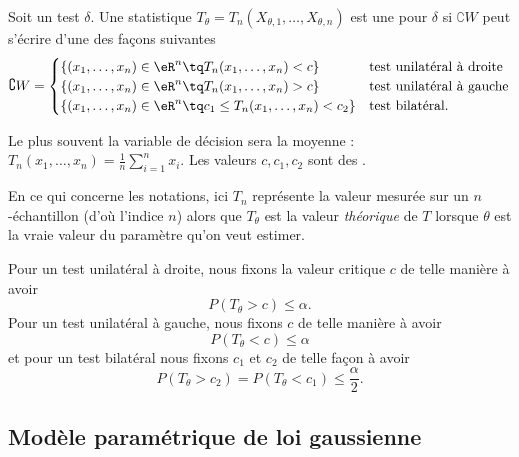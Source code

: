 Soit un test \( \delta\). Une statistique \( T_{\theta}=T_n(X_{\theta,1},\ldots,X_{\theta,n})\) est une  pour \( \delta\) si \( \complement W\) peut s'écrire d'une des façons suivantes
\begin{equation}
	\complement W=\begin{cases}
		\{ (x_1,\ldots,x_n)\in\eR^n\tq T_n(x_1,\ldots,x_n)<c \}           & \text{test unilatéral à droite} \\
		\{ (x_1,\ldots,x_n)\in\eR^n\tq T_n(x_1,\ldots,x_n)>c \}           & \text{test unilatéral à gauche} \\
		\{ (x_1,\ldots,x_n)\in\eR^n\tq c_1\leq T_n(x_1,\ldots,x_n)<c_2 \} & \text{test bilatéral}.
	\end{cases}
\end{equation}

Le plus souvent la variable de décision sera la moyenne : \( T_n(x_1,\ldots,x_n)=\frac{1}{ n }\sum_{i=1}^nx_i\). Les valeurs \( c,c_1,c_2\) sont des .

En ce qui concerne les notations, ici \( T_n\) représente la valeur mesurée sur un \( n\)-échantillon (d'où l'indice \( n\)) alors que \( T_{\theta}\) est la valeur \emph{théorique} de \( T\) lorsque \( \theta\) est la vraie valeur du paramètre qu'on veut estimer.

Pour un test unilatéral à droite, nous fixons la valeur critique \( c\) de telle manière à avoir
\begin{equation}
	P(T_{\theta}>c)\leq \alpha.
\end{equation}
Pour un test unilatéral à gauche, nous fixons \( c\) de telle manière à avoir
\begin{equation}
	P(T_{\theta}<c)\leq \alpha
\end{equation}
et pour un test bilatéral nous fixons \( c_1\) et \( c_2\) de telle façon à avoir
\begin{equation}
	P(T_{\theta}>c_2)=P(T_{\theta}<c_1)\leq\frac{ \alpha }{2}.
\end{equation}

\subsection{Modèle paramétrique de loi gaussienne}

